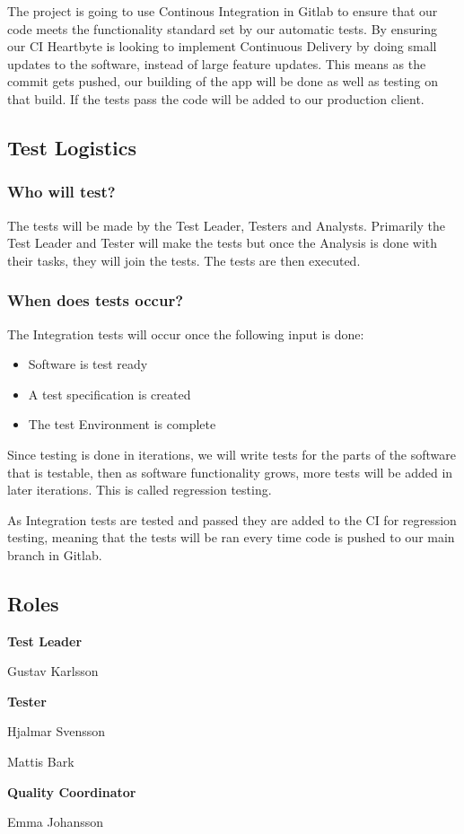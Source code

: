 The project is going to use Continous Integration in Gitlab to ensure that our code meets the functionality standard set by our automatic tests. By ensuring our CI Heartbyte is looking to implement Continuous Delivery by doing small updates to the software, instead of large feature updates. This means as the commit gets pushed, our building of the app will be done as well as testing on that build. If the tests pass the code will be added to our production client. 
\subsection{Test Logistics}
\subsubsection{Who will test?}
The tests will be made by the Test Leader, Testers and Analysts. Primarily the Test Leader and Tester will make the tests but once the Analysis is done with their tasks, they will join the tests. The tests are then executed.
\subsubsection{When does tests occur?}
The Integration tests will occur once the following input is done:
\begin{itemize}
    \item Software is test ready
    \item A test specification is created
    \item The test Environment is complete
\end{itemize}
Since testing is done in iterations, we will write tests for the parts of the software that is testable, then as software functionality grows, more tests will be added in later iterations. This is called regression testing.

As Integration tests are tested and passed they are added to the CI for regression testing, meaning that the tests will be ran every time code is pushed to our main branch in Gitlab.
\subsection{Roles}
\begin{flushleft}
   \textbf{Test Leader}
    
    
    Gustav Karlsson
  
   \textbf{Tester}
   
    Hjalmar Svensson
    
    Mattis Bark
   
   
   \textbf{Quality Coordinator}
   
    Emma Johansson
     

\end{flushleft}


\clearpage